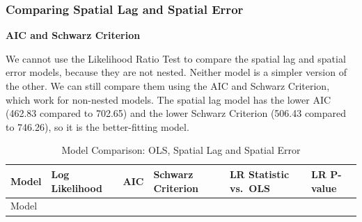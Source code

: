 \documentclass[
  12pt,
]{article}
\begin{document}
\subsubsection{Comparing Spatial Lag and Spatial
Error}\label{comparing-spatial-lag-and-spatial-error}

\textbf{AIC and Schwarz Criterion}

We cannot use the Likelihood Ratio Test to compare the spatial lag and
spatial error models, because they are not nested. Neither model is a
simpler version of the other. We can still compare them using the AIC
and Schwarz Criterion, which work for non-nested models. The spatial lag
model has the lower AIC (462.83 compared to 702.65) and the lower
Schwarz Criterion (506.43 compared to 746.26), so it is the
better-fitting model.

\begin{longtable}[]{@{}
  >{\raggedright\arraybackslash}p{}
  >{\raggedleft\arraybackslash}p{}
  >{\raggedleft\arraybackslash}p{}
  >{\raggedleft\arraybackslash}p{}
  >{\raggedleft\arraybackslash}p{}
  >{\raggedleft\arraybackslash}p{}@{}}
\caption{Model Comparison: OLS, Spatial Lag and Spatial
Error}\tabularnewline
\toprule\noalign{}
\begin{minipage}[b]{\linewidth}\raggedright
Model
\end{minipage} & \begin{minipage}[b]{\linewidth}\raggedleft
Log Likelihood
\end{minipage} & \begin{minipage}[b]{\linewidth}\raggedleft
AIC
\end{minipage} & \begin{minipage}[b]{\linewidth}\raggedleft
Schwarz Criterion
\end{minipage} & \begin{minipage}[b]{\linewidth}\raggedleft
LR Statistic vs.~OLS
\end{minipage} & \begin{minipage}[b]{\linewidth}\raggedleft
LR P-value
\end{minipage} \\
\midrule\noalign{}
\endfirsthead
\toprule\noalign{}
\begin{minipage}[b]{\linewidth}\raggedright
Model
\end{minipage} & \begin{minipage}[b]{\linewidth}\raggedleft

\end{minipage}
\end{longtable}
\end{document}
